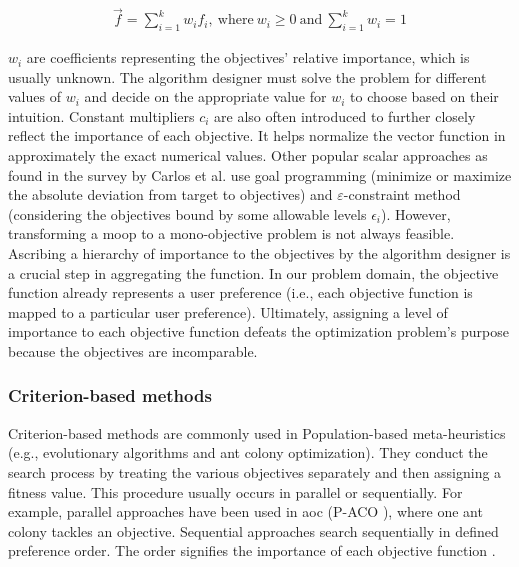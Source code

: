 \begin{gather*}
   \Vec{f} = \sum_{i=1}^k w_i f_i, \ \text{where}\ w_i \geq 0\ \text{and}\ \sum_{i=1}^k w_i = 1
\end{gather*}

$w_i$ are coefficients representing the objectives' relative importance, which is usually unknown. The algorithm designer must solve the problem for different values of $w_i$ and decide on the appropriate value for $w_i$ to choose based on their intuition. Constant multipliers $c_i$ are also often introduced to further closely reflect the importance of each objective. It helps normalize the vector function in approximately the exact numerical values.
Other popular scalar approaches as found in the survey by Carlos et al. \parencite{CoelloCoello1999ATechniquesc} use goal programming (minimize or maximize the absolute deviation from target to objectives) and $\varepsilon$-constraint method (considering the objectives bound by some allowable levels $\epsilon_i$). However, transforming a \gls{moop} to a mono-objective problem is not always feasible. Ascribing a hierarchy of importance to the objectives by the algorithm designer is a crucial step in aggregating the function. In our problem domain, the objective function already represents a user preference (i.e., each objective function is mapped to a particular user preference). Ultimately, assigning a level of importance to each objective function defeats the optimization problem's purpose because the objectives are incomparable.

\subsubsection{Criterion-based methods}
Criterion-based methods are commonly used in Population-based meta-heuristics (e.g., evolutionary algorithms and ant colony optimization). They conduct the search process by treating the various objectives separately and then assigning a fitness value. This procedure usually occurs in parallel or sequentially. For example, parallel approaches have been used in \gls{aoc} (P-ACO \parencite{Doerner2004ParetoSelection}), where one ant colony tackles an objective. Sequential approaches search sequentially in defined preference order. The order signifies the importance of each objective function \parencite{Fishburn1974ExceptionalSurvey}.

